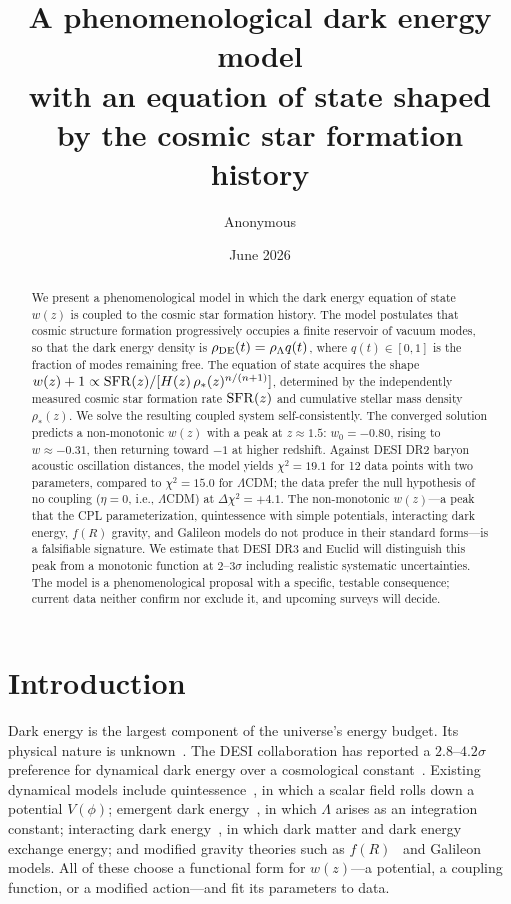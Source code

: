 \documentclass[12pt,a4paper]{article}
\begin{document}
\title{\bf A phenomenological dark energy model\\with an equation of state shaped by the cosmic star formation history}

\author{Anonymous}
\date{June 2026}

\maketitle

\begin{abstract}
We present a phenomenological model in which the dark energy equation of state $w(z)$ is coupled to the cosmic star formation history. The model postulates that cosmic structure formation progressively occupies a finite reservoir of vacuum modes, so that the dark energy density is $\rho_{\rm DE}(t)=\rho_\Lambda q(t)$, where $q(t)\in[0,1]$ is the fraction of modes remaining free. The equation of state acquires the shape $w(z)+1\propto{\rm SFR}(z)/[H(z)\,\rho_*(z)^{n/(n+1)}]$, determined by the independently measured cosmic star formation rate ${\rm SFR}(z)$ and cumulative stellar mass density $\rho_*(z)$. We solve the resulting coupled system self-consistently. The converged solution predicts a non-monotonic $w(z)$ with a peak at $z\approx1.5$: $w_0=-0.80$, rising to $w\approx-0.31$, then returning toward $-1$ at higher redshift. Against DESI DR2 baryon acoustic oscillation distances, the model yields $\chi^2=19.1$ for 12 data points with two parameters, compared to $\chi^2=15.0$ for $\Lambda$CDM; the data prefer the null hypothesis of no coupling ($\eta=0$, i.e., $\Lambda$CDM) at $\Delta\chi^2=+4.1$. The non-monotonic $w(z)$---a peak that the CPL parameterization, quintessence with simple potentials, interacting dark energy, $f(R)$ gravity, and Galileon models do not produce in their standard forms---is a falsifiable signature. We estimate that DESI DR3 and Euclid will distinguish this peak from a monotonic function at $2$--$3\sigma$ including realistic systematic uncertainties. The model is a phenomenological proposal with a specific, testable consequence; current data neither confirm nor exclude it, and upcoming surveys will decide.
\end{abstract}

\section*{Introduction}

Dark energy is the largest component of the universe's energy budget. Its physical nature is unknown~\cite{riess1998,spergel2003}. The DESI collaboration has reported a $2.8$--$4.2\sigma$ preference for dynamical dark energy over a cosmological constant~\cite{desi2025}. Existing dynamical models include quintessence~\cite{tsujikawa2013}, in which a scalar field rolls down a potential $V(\phi)$; emergent dark energy~\cite{li2024}, in which $\Lambda$ arises as an integration constant; interacting dark energy~\cite{costa2017}, in which dark matter and dark energy exchange energy; and modified gravity theories such as $f(R)$~\cite{hu2007} and Galileon~\cite{deffayet2009} models. All of these choose a functional form for $w(z)$---a potential, a coupling function, or a modified action---and fit its parameters to data.
\end{document}
